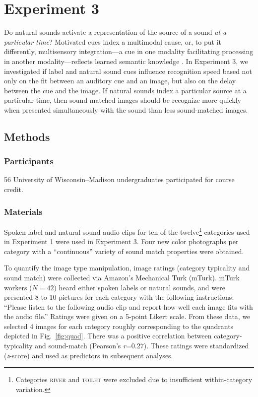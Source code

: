 \documentclass[12pt, titlepage]{article}
\begin{document}
\section{Experiment 3}
Do natural sounds activate a representation of the source of a sound \textit{at a particular time}? Motivated cues index a multimodal cause, or, to put it differently, multisensory integration---a cue in one modality facilitating processing in another modality---reflects learned semantic knowledge \cite{Fiebelkorn:2009he,Hein:2007kp,Chen:2011kc,Laurienti:2004ki}. In Experiment 3, we investigated if label and natural sound cues influence recognition speed based not only on the fit between an auditory cue and an image, but also on the delay between the cue and the image. If natural sounds index a particular source at a particular time, then sound-matched images should be recognize more quickly when presented simultaneously with the sound than less sound-matched images.

\subsection{Methods}
\subsubsection*{Participants}
56 University of Wisconsin--Madison undergraduates participated for course credit.

\subsubsection*{Materials}
Spoken label and natural sound audio clips for ten of the twelve\footnote{Categories \textsc{river} and \textsc{toilet} were excluded due to insufficient within-category variation.} categories used in Experiment 1 were used in Experiment 3. Four new color photographs per category with a ``continuous'' variety of sound match properties were obtained.

To quantify the image type manipulation, image ratings (category typicality and sound match) were collected via Amazon's Mechanical Turk (mTurk). mTurk workers ($N=42$) heard either spoken labels or natural sounds, and were presented 8 to 10 pictures for each category with the following instructions: ``Please listen to the following audio clip and report how well each image fits with the audio file.'' Ratings were given on a 5-point Likert scale. From these data, we selected 4 images for each category roughly corresponding to the quadrants depicted in Fig.~\ref{fig:quad}. There was a positive correlation between category-typicality and sound-match (Pearson's \textit{r}=$0.27$). These ratings were standardized (\emph{z}-score) and used as predictors in subsequent analyses.
\end{document}
